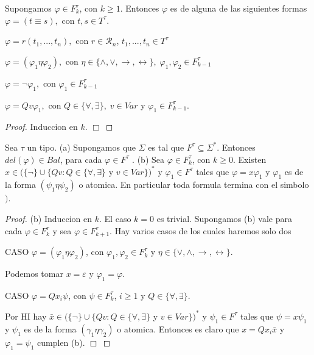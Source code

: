   \begin{lemma}
    Supongamos \(\varphi \in F_{k}^{\tau }\), con \(k\geq 1\). Entonces \(\varphi \) es de alguna de las siguientes formas
    \(\varphi =(t\equiv s),\) con \(t,s\in T^{\tau }\).

    \(\varphi =r(t_{1},...,t_{n}),\) con \(r\in \mathcal{R}_{n}\), \( t_{1},...,t_{n}\in T^{\tau }\)

    \(\varphi =(\varphi _{1}\eta \varphi _{2}),\) con \(\eta \in \{\wedge ,\vee ,\rightarrow ,\leftrightarrow \},\;\varphi _{1},\varphi _{2}\in F_{k-1}^{\tau }\)

    \(\varphi =\lnot \varphi _{1},\) con \(\varphi _{1}\in F_{k-1}^{\tau }\)

    \(\varphi =Qv\varphi _{1},\) con \(Q\in \{\forall ,\exists \},\;v\in Var\) y \( \varphi _{1}\in F_{k-1}^{\tau }.\)
  \end{lemma}
  \begin{proof}
    Induccion en \(k\). \(\Box\)
  \end{proof}

  \begin{lemma}
    Sea \(\tau \) un tipo.
    (a) Supongamos que \(\Sigma \) es tal que \(F^{\tau }\subseteq \Sigma ^{\ast }\). Entonces \(del(\varphi )\in Bal\), para cada \(\varphi \in F^{\tau }\) .
    (b) Sea \(\varphi \in F_{k}^{\tau }\), con \(k\geq 0\). Existen \(x\in (\{\lnot \}\cup \{Qv:Q\in \{\forall ,\exists \}\) y \(v\in Var\})^{\ast }\) y \( \varphi _{1}\in F^{\tau }\) tales que \(\varphi =x\varphi _{1}\) y \(\varphi _{1} \) es de la forma \((\psi _{1}\eta \psi _{2})\) o atomica. En particular toda formula termina con el simbolo \()\).
  \end{lemma}
  \begin{proof}
    (b) Induccion en \(k\). El caso \(k=0\) es trivial. Supongamos (b) vale para cada \(\varphi \in F_{k}^{\tau }\) y sea \(\varphi \in F_{k+1}^{\tau }\). Hay varios casos de los cuales haremos solo dos

    CASO \(\varphi =(\varphi _{1}\eta \varphi _{2})\), con \(\varphi _{1},\varphi _{2}\in F_{k}^{\tau }\) y \(\eta \in \{\vee ,\wedge ,\rightarrow ,\leftrightarrow \}\).

    Podemos tomar \(x=\varepsilon \) y \(\varphi _{1}=\varphi \).

    CASO \(\varphi =Qx_{i}\psi \), con \(\psi \in F_{k}^{\tau }\), \(i\geq 1\) y \(Q\in \{\forall ,\exists \}\).

    Por HI hay \(\bar{x}\in (\{\lnot \}\cup \{Qv:Q\in \{\forall ,\exists \}\) y \(v\in Var\})^{\ast }\) y \(\psi _{1}\in F^{\tau }\) tales que \( \psi =x\psi _{1}\) y \(\psi _{1}\) es de la forma \((\gamma _{1}\eta \gamma _{2}) \) o atomica. Entonces es claro que \(x=Qx_{i}\bar{x}\) y \(\varphi _{1}=\psi _{1}\) cumplen (b). \(\Box\)
  \end{proof}

